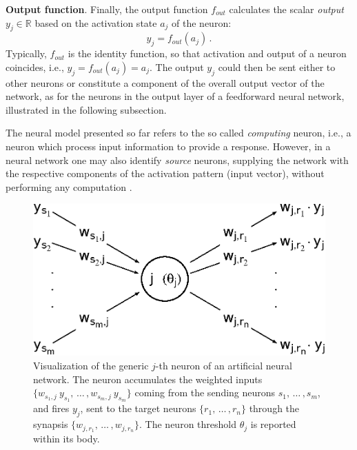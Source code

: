 \documentclass{elsarticle}
\numberwithin{equation}{section}
\theoremstyle{theorem}
\theoremstyle{definition}
\theoremstyle{remark}
\theoremstyle{proposition}
\numberwithin{figure}{section}
\begin{document}
		\noindent \textbf{Output function}. Finally, the output function $f_{out}$ calculates the scalar \emph{output} $y_j \in \mathbb{R}$ based on the activation state $a_j$ of the neuron:
		\begin{equation*}
			\label{eq:output-function}
			y_j = f_{out}(a_j) \, .
		\end{equation*} 
		Typically, $f_{out}$ is the identity function, so that activation and output of a neuron coincides, i.e., $y_j = f_{out}(a_j) = a_j$. %
		The output $y_j$ could then be sent either to other neurons or constitute a component of the overall output vector of the network, as for the neurons in the output layer of a feedforward neural network, illustrated in the following subsection.
		
		\vspace*{0.3cm}
		
		The neural model presented so far refers to the so called \emph{computing} neuron, i.e., a neuron which process input information to provide a response. However, in a neural network one may also identify \emph{source} neurons, supplying the network with the respective components of the activation pattern (input vector), without performing any computation \cite{Hay05}.
		
		
		\iffalse
		\begin{figure}[H]
			\center
			\includegraphics[scale = 0.6]{neural_model_ter.eps}
			
			\caption{Visualization of the generic $j$-th neuron of an artificial neural network. The neuron accumulates the weighted inputs $\big\lbrace w_{s_1,j} ~ y_{s_1}, \, \ldots \, , w_{s_m,j} ~ y_{s_m} \big\rbrace$ coming from the sending neurons $s_1, \, \ldots \, , s_m$, and fires $y_j$, sent to the target neurons $\big\lbrace r_1, \, \ldots \, , r_n \big\rbrace$ through the synapsis $\big\lbrace w_{j,r_1}, \, \ldots \, , w_{j,r_n} \big\rbrace$. The neuron threshold $\theta_j$ is reported within its body.} 
			\label{fig:neural-model}
		\end{figure}
		
\end{document}
